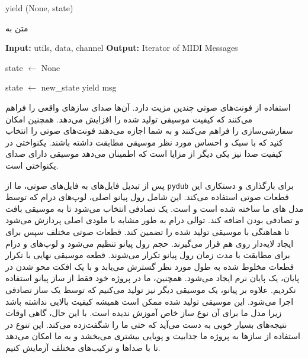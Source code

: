 \begin{LTR}
\begin{algorithm}
\begin{algorithmic}[1]
                  \State yield (None, state)
            \end{algorithmic}
      \end{algorithm}

      \begin{algorithm}
            \setmainfont{Times New Roman}
            \caption{متن به }
            \label{al:strMidi}
            \begin{algorithmic}[1]
                  \State \textbf{Input:} utils, data, channel
                  \State \textbf{Output:} Iterator of MIDI Messages

                  \State state $\leftarrow$ None

                  \State state $\leftarrow$ new\_state
                  \State yield msg
                  \EndIf
                  \EndFor
                  \EndFor

            \end{algorithmic}
      \end{algorithm}
\end{LTR}

استفاده از فونت‌های صوتی چندین مزیت دارد. آن‌ها صدای سازهای واقعی را فراهم
می‌کنند که کیفیت موسیقی تولید شده را افزایش می‌دهد. همچنین امکان
سفارشی‌سازی را فراهم می‌کنند و به شما اجازه می‌دهند فونت‌های صوتی را انتخاب
کنید که با سبک و احساس مورد نظر موسیقی مطابقت داشته باشند. یکنواختی در
کیفیت صدا نیز یکی دیگر از مزایا است که اطمینان می‌دهد موسیقی دارای صدای
یکنواختی است. 

پس از تبدیل فایل‌های  به فایل‌های صوتی، ما از \texttt{pydub} برای
بارگذاری و دستکاری این قطعات صوتی استفاده می‌کند. این شامل رول پیانو
اصلی، لوپ‌های درام که توسط مدل های ما ساخته شده است و   است. یک  تصادفی انتخاب می‌شود
تا به موسیقی بافت و تصادفی بودن اضافه کند. توالی درام به طور مشابه با
ملودی اصلی پردازش می‌شود تا هماهنگی با موسیقی تولید شده را تضمین کند.
قطعات صوتی مختلف سپس برای ایجاد لایه‌دار روی هم قرار
می‌گیرند. حجم رول پیانو تنظیم می‌شود و لوپ‌های  و درام برای مطابقت با
مدت زمان رول پیانو تکرار می‌شوند. قطعه موسیقی نهایی با تکرار قطعات مخلوط
شده به طول مورد نظر گسترش می‌یابد و با یک افکت محو شدن در پایان، یک پایان
نرم ایجاد می‌شود.
همچنین، ما در پروژه خود فقط از ساز پیانو استفاده نکردیم. علاوه بر پیانو، یک موسیقی دیگر نیز تولید می‌کنیم که توسط یک ساز تصادفی اجرا می‌شود. این موسیقی تولید شده ممکن است همیشه کیفیت بالایی نداشته باشد زیرا مدل ما برای آن نوع ساز خاص آموزش ندیده است. با این حال، گاهی اوقات نتیجه‌های بسیار خوبی به دست می‌آید که حتی ما را شگفت‌زده می‌کند. این تنوع در استفاده از سازها به پروژه ما جذابیت و پویایی بیشتری می‌بخشد و به ما امکان می‌دهد تا با صداها و ترکیب‌های مختلف آزمایش کنیم.

